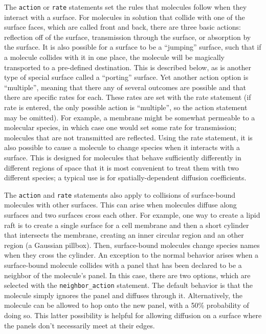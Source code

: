\documentclass {scrbook}
\newcommand {\ttt} {\texttt}
\begin{document}
The \ttt{action} or \ttt{rate} statements set the rules that molecules follow when they interact with a surface. For molecules in solution that collide with one of the surface faces, which are called front and back, there are three basic actions: reflection off of the surface, transmission through the surface, or absorption by the surface. It is also possible for a surface to be a ``jumping'' surface, such that if a molecule collides with it in one place, the molecule will be magically transported to a pre-defined destination. This is described below, as is another type of special surface called a ``porting'' surface. Yet another action option is ``multiple'', meaning that there any of several outcomes are possible and that there are specific rates for each. These rates are set with the rate statement (if rate is entered, the only possible action is ``multiple'', so the action statement may be omitted). For example, a membrane might be somewhat permeable to a molecular species, in which case one would set some rate for transmission; molecules that are not transmitted are reflected. Using the rate statement, it is also possible to cause a molecule to change species when it interacts with a surface. This is designed for molecules that behave sufficiently differently in different regions of space that it is most convenient to treat them with two different species; a typical use is for spatially-dependent diffusion coefficients.

The \ttt{action} and \ttt{rate} statements also apply to collisions of surface-bound molecules with other surfaces. This can arise when molecules diffuse along surfaces and two surfaces cross each other. For example, one way to create a lipid raft is to create a single surface for a cell membrane and then a short cylinder that intersects the membrane, creating an inner circular region and an other region (a Gaussian pillbox). Then, surface-bound molecules change species names when they cross the cylinder. An exception to the normal behavior arises when a surface-bound molecule collides with a panel that has been declared to be a neighbor of the molecule's panel. In this case, there are two options, which are selected with the \ttt{neighbor\_action} statement. The default behavior is that the molecule simply ignores the panel and diffuses through it. Alternatively, the molecule can be allowed to hop onto the new panel, with a 50\% probability of doing so. This latter possibility is helpful for allowing diffusion on a surface where the panels don't necessarily meet at their edges.
\end{document}
